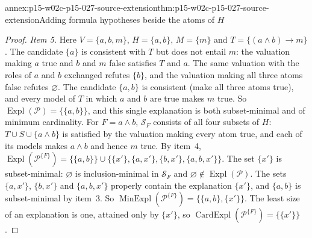 \begin{annexitem}{annex:p15-w02c-p15-027-source-extension}{thm:p15-w02c-p15-027-source-extension}{Adding formula hypotheses beside the atoms of \texorpdfstring{\(H\)}{H}}
\begin{proof}
\emph{Item 5.} Here \(V=\{a,b,m\}\), \(H=\{a,b\}\), \(M=\{m\}\) and
\(T=\{(a\land b)\to m\}\). The candidate \(\{a\}\) is consistent with
\(T\) but does not entail \(m\): the valuation making \(a\) true and
\(b\) and \(m\) false satisfies \(T\) and \(a\). The same valuation with
the roles of \(a\) and \(b\) exchanged refutes \(\{b\}\), and the
valuation making all three atoms false refutes \(\varnothing\). The
candidate \(\{a,b\}\) is consistent (make all three atoms true), and every
model of \(T\) in which \(a\) and \(b\) are true makes \(m\) true. So
\(\operatorname{Expl}(\mathcal P)=\{\{a,b\}\}\), and this single
explanation is both subset-minimal and of minimum cardinality. For
\(F=a\land b\), \(\mathcal S_F\) consists of all four subsets of \(H\):
\(T\cup S\cup\{a\land b\}\) is satisfied by the valuation making every atom
true, and each of its models makes \(a\land b\) and hence \(m\) true. By
item~4,
\(\operatorname{Expl}(\mathcal P^{\{F\}})=\{\{a,b\}\}\cup
\{\{x'\},\{a,x'\},\{b,x'\},\{a,b,x'\}\}\). The set \(\{x'\}\) is
subset-minimal: \(\varnothing\) is inclusion-minimal in \(\mathcal S_F\)
and \(\varnothing\notin\operatorname{Expl}(\mathcal P)\). The sets
\(\{a,x'\}\), \(\{b,x'\}\) and \(\{a,b,x'\}\) properly contain the
explanation \(\{x'\}\), and \(\{a,b\}\) is subset-minimal by item~3. So
\(\operatorname{MinExpl}(\mathcal P^{\{F\}})=\{\{a,b\},\{x'\}\}\). The
least size of an explanation is one, attained only by \(\{x'\}\), so
\(\operatorname{CardExpl}(\mathcal P^{\{F\}})=\{\{x'\}\}\).
\end{proof}
\end{annexitem}


